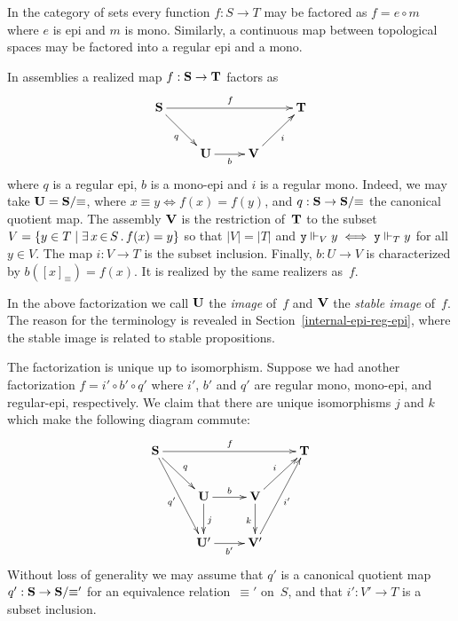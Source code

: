In the category of sets every function $f : S \to T$ may be factored
as $f = e \circ m$ where $e$ is epi and $m$ is mono. Similarly, a
continuous map between topological spaces may be factored into a
regular epi and a mono.

In assemblies a realized map $f : \mathbf{S} \to \mathbf{T}$ factors as
%
\begin{equation*}
  \xymatrix{
    {\asm{S}}
    \ar[rrr]^{f}
    \ar[rd]_{q}
    &
    &
    &
    {\asm{T}}
    \\
    &
    {\asm{U}}
    \ar[r]_{b}
    &
    {\asm{V}}
    \ar[ru]_{i}
    &
  }
\end{equation*}
%
where $q$ is a regular epi, $b$ is a mono-epi and $i$ is a regular
mono. Indeed, we may take $\mathbf{U} = \mathbf{S}/{\equiv}$, where $x
\equiv y \iff f(x) = f(y)$, and $q : \mathbf{S} \to \mathbf{S}/{\equiv}$ the
canonical quotient map. The assembly $\mathbf{V}$ is the restriction
of~$\mathbf{T}$ to the subset $V = \{y \in T \mid \exists\, x \,{\in}\, S\,.\,f(x) =
    y\}$ so that $|V| = |T|$ and $\mathtt{y} \Vdash_V y \iff \mathtt{y} \Vdash_T y$
for all $y \in V$. The map $i : V \to T$ is the subset inclusion.
Finally, $b : U \to V$ is characterized by $b([x]_{\equiv}) = f(x)$.
It is realized by the same realizers as~$f$.

In the above factorization we call $\mathbf{U}$ the \emph{image} of~$f$
and $\mathbf{V}$ the \emph{stable image} of~$f$. The reason for the
terminology is revealed in Section~\ref{internal-epi-reg-epi}, where
the stable image is related to stable propositions.

The factorization is unique up to isomorphism. Suppose we had another
factorization $f = i' \circ b' \circ q'$ where $i'$, $b'$ and $q'$ are
regular mono, mono-epi, and regular-epi, respectively. We claim that
there are unique isomorphisms $j$ and $k$ which make the following
diagram commute:
%
\begin{equation*}
  \xymatrix{
    {\asm{S}}
    \ar[rrr]^{f}
    \ar[rd]^{q}
    \ar[rdd]_{q'}
    &
    &
    &
    {\asm{T}}
    \\
    &
    {\asm{U}}
    \ar[r]^{b}
    \ar[d]^{j}
    &
    {\asm{V}}
    \ar[ru]^{i}
    \ar[d]_{k}
    &
    \\
    &
    {\asm{U}'}
    \ar[r]_{b'}
    &
    {\asm{V}'}
    \ar[ruu]_{i'}
    &    
  }
\end{equation*}
%
Without loss of generality we may assume that $q'$ is a canonical
quotient map $q' : \mathbf{S} \to \mathbf{S}/{\equiv'}$ for an equivalence
relation~$\equiv'$ on~$S$, and that $i' : V' \to T$ is a subset
inclusion.

